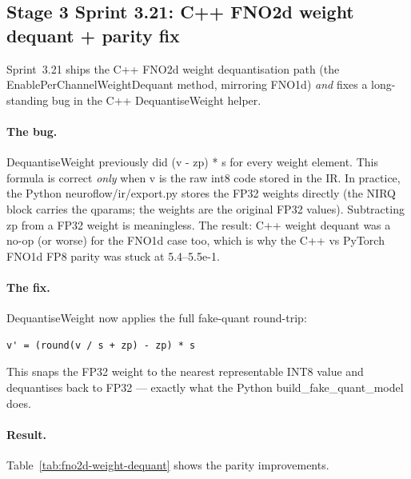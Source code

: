 \documentclass[10pt,twocolumn]{article}
\renewcommand{\texttt}[1]{{\normalfont\ttfamily #1}\normalfont\rmfamily}
\begin{document}
\subsection{Stage 3 Sprint 3.21: C++ FNO2d weight dequant + parity fix}
\label{sec:fno2d-weight-dequant}

Sprint~3.21 ships the C++ FNO2d weight
dequantisation path (the \texttt{EnablePerChannelWeightDequant}
method, mirroring FNO1d) \emph{and} fixes a long-
standing bug in the C++ \texttt{DequantiseWeight}
helper.

\paragraph{The bug.}
\texttt{DequantiseWeight} previously did
\texttt{(v - zp) * s} for every weight element.
This formula is correct \emph{only} when \texttt{v}
is the raw int8 code stored in the IR.  In
practice, the Python
\texttt{neuroflow/ir/export.py} stores the FP32
weights directly (the NIRQ block carries the
qparams; the weights are the original FP32 values).
Subtracting \texttt{zp} from a FP32 weight is
meaningless.  The result: C++ weight dequant was a
no-op (or worse) for the FNO1d case too, which is
why the C++ vs PyTorch FNO1d FP8 parity was stuck
at 5.4--5.5e-1.

\paragraph{The fix.}
\texttt{DequantiseWeight} now applies the full
fake-quant round-trip:
\begin{verbatim}
v' = (round(v / s + zp) - zp) * s
\end{verbatim}
This snaps the FP32 weight to the nearest
representable INT8 value and dequantises back to
FP32 — exactly what the Python
\texttt{build\_fake\_quant\_model} does.

\paragraph{Result.}
Table~\ref{tab:fno2d-weight-dequant} shows the
parity improvements.
\end{document}
